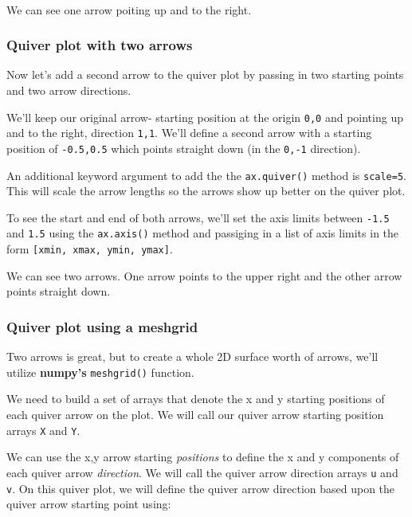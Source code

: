 \documentclass{book}
\begin{document}
    \begin{center}
    \end{center}
    { \hspace*{\fill} \\}
    
    We can see one arrow poiting up and to the right.

    \subsubsection{Quiver plot with two
arrows}\label{quiver-plot-with-two-arrows}

Now let's add a second arrow to the quiver plot by passing in two
starting points and two arrow directions.

We'll keep our original arrow- starting position at the origin
\lstinline!0,0! and pointing up and to the right, direction
\lstinline!1,1!. We'll define a second arrow with a starting position of
\lstinline!-0.5,0.5! which points straight down (in the \lstinline!0,-1!
direction).

An additional keyword argument to add the the \lstinline!ax.quiver()!
method is \lstinline!scale=5!. This will scale the arrow lengths so the
arrows show up better on the quiver plot.

To see the start and end of both arrows, we'll set the axis limits
between \lstinline!-1.5! and \lstinline!1.5! using the
\lstinline!ax.axis()! method and passiging in a list of axis limits in
the form \lstinline![xmin, xmax, ymin, ymax]!.

    We can see two arrows. One arrow points to the upper right and the other
arrow points straight down.

    \subsubsection{Quiver plot using a
meshgrid}\label{quiver-plot-using-a-meshgrid}

Two arrows is great, but to create a whole 2D surface worth of arrows,
we'll utilize \textbf{numpy's} \lstinline!meshgrid()! function.

We need to build a set of arrays that denote the x and y starting
positions of each quiver arrow on the plot. We will call our quiver
arrow starting position arrays \lstinline!X! and \lstinline!Y!.

We can use the x,y arrow starting \emph{positions} to define the x and y
components of each quiver arrow \emph{direction}. We will call the
quiver arrow direction arrays \lstinline!u! and \lstinline!v!. On this
quiver plot, we will define the quiver arrow direction based upon the
quiver arrow starting point using:
\end{document}
